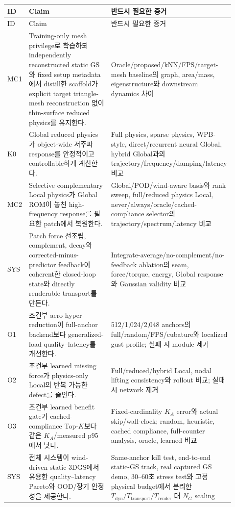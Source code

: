 \documentclass[11pt,a4paper]{article}
\begin{document}
\begin{longtable}{L{0.08\linewidth}L{0.36\linewidth}L{0.48\linewidth}}
\toprule
ID & Claim & 반드시 필요한 증거 \\
\midrule
\endfirsthead
\toprule
ID & Claim & 반드시 필요한 증거 \\
\midrule
\endhead
MC1 & Training-only mesh privilege로 학습하되 independently reconstructed static GS와 fixed setup metadata에서
distill한 scaffold가 explicit target triangle-mesh reconstruction 없이 thin-surface reduced physics를 유지한다.
& Oracle/proposed/kNN/FPS/target-mesh baseline의 graph, area/mass, eigenstructure와 downstream dynamics 차이 \\
\addlinespace
K0 & Global reduced physics가 object-wide 저주파 response를 안정적이고 controllable하게 계산한다.
& Full physics, sparse physics, WPB-style, direct/recurrent neural Global, hybrid Global과의 trajectory/frequency/damping/latency 비교 \\
\addlinespace
MC2 & Selective complementary Local physics가 Global ROM이 놓친 high-frequency response를 필요한 patch에서 복원한다.
& Global/POD/wind-aware basis와 rank sweep, full/reduced physics Local,
never/always/oracle/cached-compliance selector의 trajectory/spectrum/latency 비교 \\
\addlinespace
SYS & Patch force 선조립, complement, decay와 corrected-minus-predictor feedback이 coherent한 closed-loop state와 directly renderable transport를 만든다.
& Integrate-average/no-complement/no-feedback ablation의 seam, force/torque, energy, Global response와 Gaussian validity 비교 \\
\addlinespace
O1 & 조건부 aero hyper-reduction이 full-anchor backend보다 generalized-load quality--latency를 개선한다.
& 512/1,024/2,048 anchors의 full/random/FPS/cubature와 localized gust profile; 실패 시 module 제거 \\
\addlinespace
O2 & 조건부 learned missing force가 physics-only Local의 반복 가능한 defect를 줄인다.
& Full/reduced/hybrid Local, nodal lifting consistency와 rollout 비교; 실패 시 network 제거 \\
\addlinespace
O3 & 조건부 learned benefit gate가 cached-compliance Top-\(K\)보다 같은 \(K_A\)/measured p95에서 낫다.
& Fixed-cardinality \(K_A\) error와 actual skip/wall-clock;
random, heuristic, cached compliance, full-counter analysis, oracle, learned 비교 \\
\addlinespace
SYS & 전체 시스템이 wind-driven static 3DGS에서 유용한 quality--latency Pareto와 OOD/장기 안정성을 제공한다.
& Same-anchor kill test, end-to-end static-GS track, real captured GS demo, 30--60초 stress test와
고정 physical budget에서 분리한 \(T_{\mathrm{dyn}}/T_{\mathrm{transport}}/T_{\mathrm{render}}\) 대 \(N_G\) scaling \\
\bottomrule
\end{longtable}
\end{document}
